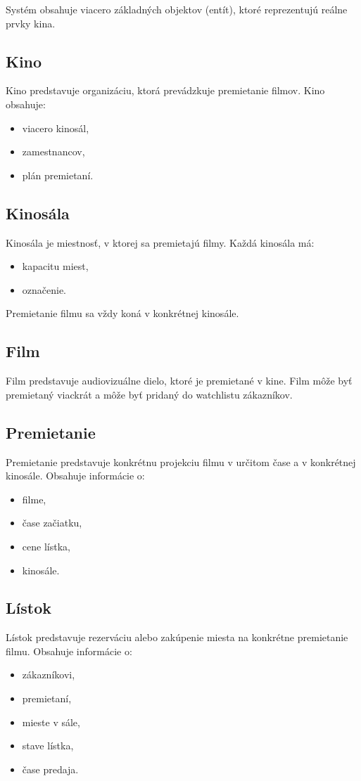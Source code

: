 \documentclass[11pt, a4paper]{article}
\begin{document}
Systém obsahuje viacero základných objektov (entít), ktoré reprezentujú reálne prvky kina.

\subsection{Kino}
Kino predstavuje organizáciu, ktorá prevádzkuje premietanie filmov. Kino obsahuje:
\begin{itemize}
    \item viacero kinosál,
    \item zamestnancov,
    \item plán premietaní.
\end{itemize}

\subsection{Kinosála}
Kinosála je miestnosť, v ktorej sa premietajú filmy. Každá kinosála má:
\begin{itemize}
    \item kapacitu miest,
    \item označenie.
\end{itemize}
Premietanie filmu sa vždy koná v konkrétnej kinosále.

\subsection{Film}
Film predstavuje audiovizuálne dielo, ktoré je premietané v kine. Film môže byť premietaný
viackrát a môže byť pridaný do watchlistu zákazníkov.

\subsection{Premietanie}
Premietanie predstavuje konkrétnu projekciu filmu v určitom čase a v konkrétnej kinosále.
Obsahuje informácie o:
\begin{itemize}
    \item filme,
    \item čase začiatku,
    \item cene lístka,
    \item kinosále.
\end{itemize}

\subsection{Lístok}
Lístok predstavuje rezerváciu alebo zakúpenie miesta na konkrétne premietanie filmu.
Obsahuje informácie o:
\begin{itemize}
    \item zákazníkovi,
    \item premietaní,
    \item mieste v sále,
    \item stave lístka,
    \item čase predaja.
\end{itemize}
\end{document}
